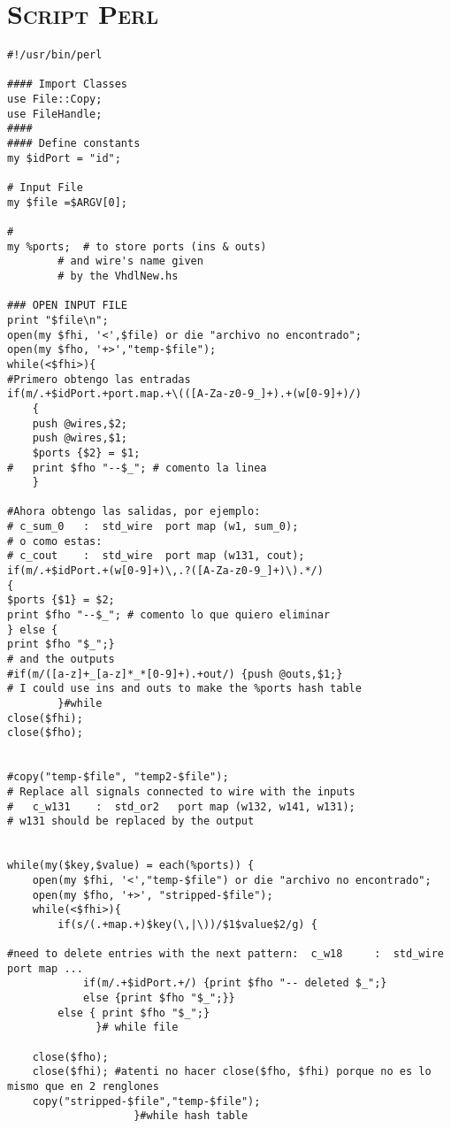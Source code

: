 \chapter{\textsc{ Script Perl }}\label{scriptPerl}
\small{
\begin{verbatim}
#!/usr/bin/perl 

#### Import Classes
use File::Copy;
use FileHandle;
####
#### Define constants
my $idPort = "id";

# Input File
my $file =$ARGV[0];

#
my %ports;	# to store ports (ins & outs)
		# and wire's name given
		# by the VhdlNew.hs

### OPEN INPUT FILE 
print "$file\n";
open(my $fhi, '<',$file) or die "archivo no encontrado";
open(my $fho, '+>',"temp-$file");
while(<$fhi>){
#Primero obtengo las entradas
if(m/.+$idPort.+port.map.+\(([A-Za-z0-9_]+).+(w[0-9]+)/)
	{
	push @wires,$2;
	push @wires,$1;
	$ports {$2} = $1;
#	print $fho "--$_"; # comento la linea
	} 

#Ahora obtengo las salidas, por ejemplo:
# c_sum_0   :  std_wire  port map (w1, sum_0);
# o como estas:
# c_cout    :  std_wire  port map (w131, cout);
if(m/.+$idPort.+(w[0-9]+)\,.?([A-Za-z0-9_]+)\).*/)                          
{
$ports {$1} = $2;
print $fho "--$_"; # comento lo que quiero eliminar
} else {
print $fho "$_";}
# and the outputs
#if(m/([a-z]+_[a-z]*_*[0-9]+).+out/) {push @outs,$1;}
# I could use ins and outs to make the %ports hash table
		}#while
close($fhi);
close($fho);


#copy("temp-$file", "temp2-$file");
# Replace all signals connected to wire with the inputs 
#   c_w131    :  std_or2   port map (w132, w141, w131);
# w131 should be replaced by the output


while(my($key,$value) = each(%ports)) {
	open(my $fhi, '<',"temp-$file") or die "archivo no encontrado";
	open(my $fho, '+>', "stripped-$file");
	while(<$fhi>){
		if(s/(.+map.+)$key(\,|\))/$1$value$2/g) {

#need to delete entries with the next pattern:  c_w18     :  std_wire  port map ...
			if(m/.+$idPort.+/) {print $fho "-- deleted $_";}
			else {print $fho "$_";}}
		else { print $fho "$_";}
		      }# while file 

	close($fho);
	close($fhi); #atenti no hacer close($fho, $fhi) porque no es lo mismo que en 2 renglones
	copy("stripped-$file","temp-$file");
					}#while hash table
\end{verbatim}
} %

